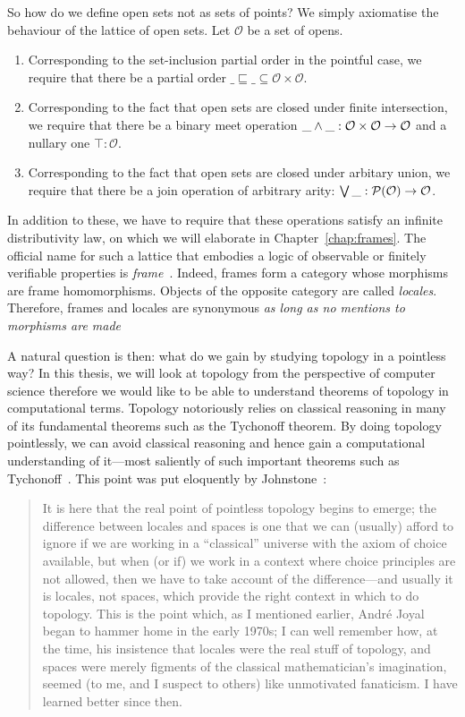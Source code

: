 So how do we define open sets not as sets of points? We simply axiomatise the behaviour of
the lattice of open sets. Let $\mathcal{O}$ be a set of opens.
\begin{enumerate}
  \item Corresponding to the set-inclusion partial order in the pointful case, we require
    that there be a partial order $\_\sqsubseteq\_ \subseteq \mathcal{O} \times \mathcal{O}$.
  \item Corresponding to the fact that open sets are closed under finite intersection, we
    require that there be a binary meet operation $\_ \wedge \_ : \mathcal{O} \times
    \mathcal{O} \rightarrow \mathcal{O}$ and a nullary one $\top : \mathcal{O}$.
  \item Corresponding to the fact that open sets are closed under arbitary union, we
    require that there be a join operation of arbitrary arity: $\bigvee{}\_ :
    \mathcal{P}(\mathcal{O}) \rightarrow \mathcal{O}$.
\end{enumerate}
In addition to these, we have to require that these operations satisfy an infinite
distributivity law, on which we will elaborate in Chapter~\ref{chap:frames}. The official
name for such a lattice that embodies a logic of observable or finitely verifiable
properties is \emph{frame}~\cite{vickers}. Indeed, frames form a category whose morphisms
are frame homomorphisms. Objects of the opposite category are called \emph{locales}.
Therefore, frames and locales are synonymous
\emph{as long as no mentions to morphisms are made}~\cite{vickers, stone-spaces}

A natural question is then: what do we gain by studying topology in a pointless way? In
this thesis, we will look at topology from the perspective of computer science therefore
we would like to be able to understand theorems of topology in computational terms.
Topology notoriously relies on classical reasoning in many of its fundamental theorems
such as the Tychonoff theorem. By doing topology pointlessly, we can avoid classical
reasoning and hence gain a computational understanding of it---most saliently of such
important theorems such as Tychonoff~\cite{coq-tychonoff}. This point was put eloquently
by Johnstone~\cite[pg.~46]{stone-spaces}:
\begin{quote}
  It is here that the real point of pointless topology begins to emerge; the difference
  between locales and spaces is one that we can (usually) afford to ignore if we are
  working in a ``classical'' universe with the axiom of choice available, but when (or if)
  we work in a context where choice principles are not allowed, then we have to take
  account of the difference—and usually it is locales, not spaces, which provide the right
  context in which to do topology. This is the point which, as I mentioned earlier,
  Andr\'{e} Joyal began to hammer home in the early 1970s; I can well remember how, at the
  time, his insistence that locales were the real stuff of topology, and spaces were
  merely figments of the classical mathematician's imagination, seemed (to me, and I
  suspect to others) like unmotivated fanaticism. I have learned better since then.
\end{quote}

